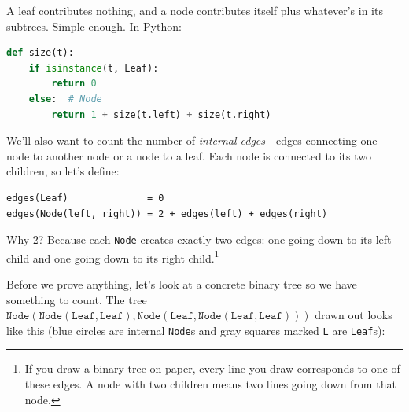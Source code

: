 \documentclass[11pt]{article}
\begin{document}
A leaf contributes nothing, and a node contributes itself plus whatever's in its subtrees. Simple enough. In Python:

\begin{lstlisting}[language=Python]
def size(t):
    if isinstance(t, Leaf):
        return 0
    else:  # Node
        return 1 + size(t.left) + size(t.right)
\end{lstlisting}

We'll also want to count the number of \emph{internal edges}---edges connecting one node to another node or a node to a leaf. Each node is connected to its two children, so let's define:

\begin{lstlisting}
edges(Leaf)              = 0
edges(Node(left, right)) = 2 + edges(left) + edges(right)
\end{lstlisting}

Why 2? Because each \texttt{Node} creates exactly two edges: one going down to its left child and one going down to its right child.\footnote{If you draw a binary tree on paper, every line you draw corresponds to one of these edges. A node with two children means two lines going down from that node.}

Before we prove anything, let's look at a concrete binary tree so we have something to count. The tree $\texttt{Node}(\texttt{Node}(\texttt{Leaf}, \texttt{Leaf}), \texttt{Node}(\texttt{Leaf}, \texttt{Node}(\texttt{Leaf}, \texttt{Leaf})))$ drawn out looks like this (blue circles are internal \texttt{Node}s and gray squares marked \texttt{L} are \texttt{Leaf}s):

\begin{center}
\end{center}
\end{document}
